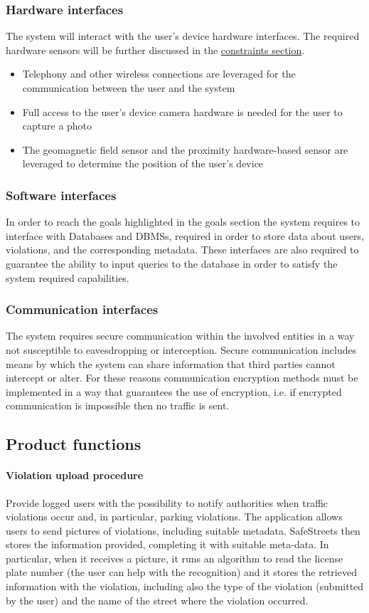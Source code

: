 \subsubsection{Hardware interfaces}
	The system will interact with the user's device hardware interfaces. The required hardware sensors will be further discussed in the \hyperref[sec:constraints]{constraints section}.
	
	\begin{itemize} 
		\item Telephony and other wireless connections are leveraged for the communication between the user and the system
		\item Full access to the user's device camera hardware is needed for the user to capture a photo
		\item The geomagnetic field sensor and the proximity hardware-based sensor are leveraged to determine the position of the user's device
	\end{itemize}

\subsubsection{Software interfaces}
	In order to reach the goals highlighted in the goals section the system requires to interface with Databases and DBMSs, required in order to store data about users, violations, and the corresponding metadata. These interfaces are also required to guarantee the ability to input queries to the database in order to satisfy the system required capabilities.
	
\subsubsection{Communication interfaces}
	The system requires secure communication within the involved entities in a way not susceptible to eavesdropping or interception. Secure communication includes means by which the system can share information that third parties cannot intercept or alter. For these reasons communication encryption methods must be implemented in a way that guarantees the use of encryption, i.e. if encrypted communication is impossible then no traffic is sent.
	
\subsection{Product functions}
\paragraph{Violation upload procedure} 
Provide logged users with the possibility to notify authorities when traffic violations occur and, in particular, parking violations. The application allows users to send pictures of violations, including suitable metadata.
SafeStreets then stores the information provided, completing it with suitable meta-­data. In particular, when it receives a picture, it runs an algorithm to read the license plate number (the user can help with the recognition) and it stores the retrieved information with the violation, including also the type of the violation (submitted by the user) and the name of the street where the violation occurred.

